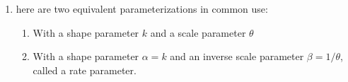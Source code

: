 \begin{enumerate}
    \item here are two equivalent parameterizations in common use:
    \begin{enumerate}
        \item With a shape parameter $k$ and a scale parameter $\theta$

        \item With a shape parameter ${ \alpha =k}$ and an inverse scale parameter ${ \beta =1/\theta }$, called a rate parameter.

    \end{enumerate}

\end{enumerate}




































